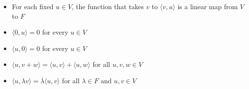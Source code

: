 \documentclass{memoir}
\begin{document}
\begin{cor}
	\begin{itemize}
		\item For each fixed $u \in V$, the function that takes $v$ to $ \langle v, u \rangle $ is a linear map from $V$ to $F$ 
		\item $ \langle 0, u \rangle = 0$ for every $u \in V$ 
		\item $ \langle u, 0 \rangle = 0$ for every $u \in V$ 
		\item $ \langle u, v+w \rangle = \langle u, v \rangle + \langle u, w \rangle $ for all $u,v,w \in V$
		\item $ \langle u, \lambda v \rangle  = \overline{\lambda} \langle u, v \rangle $ for all $\lambda \in F$ and $u,v \in V$
	\end{itemize}
\end{cor}
\end{document}
